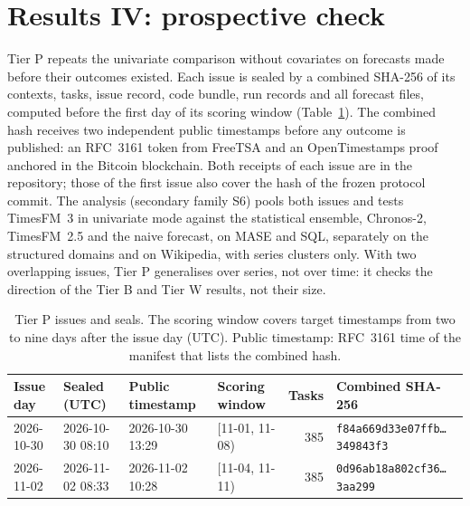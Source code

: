 \section{Results IV: prospective check}
\label{sec:prospective}

Tier P repeats the univariate comparison without covariates on forecasts made before their outcomes existed. Each issue is sealed by a
combined SHA-256 of its contexts, tasks, issue record, code bundle, run records and all forecast files, computed before the first
day of its scoring window (Table~\ref{tab:seals}). The combined hash receives two independent public timestamps before any outcome is
published: an RFC~3161 token from FreeTSA and an OpenTimestamps proof anchored in the Bitcoin blockchain. Both receipts of each issue are in the
repository; those of the first issue also cover the hash of the frozen protocol commit. The analysis (secondary family S6) pools both issues and tests TimesFM~3 in
univariate mode against the statistical ensemble, Chronos-2, TimesFM~2.5 and the naive forecast, on MASE and SQL, separately on the
structured domains and on Wikipedia, with series clusters only. With two overlapping issues, Tier P generalises over series, not
over time: it checks the direction of the Tier B and Tier W results, not their size.

\begin{table}[h]
\centering
\caption{Tier P issues and seals. The scoring window covers target timestamps from two to nine days after the issue day (UTC).
Public timestamp: RFC~3161 time of the manifest that lists the combined hash.}
\label{tab:seals}
\scriptsize
\begin{tabular}{llllrl}
\toprule
Issue day & Sealed (UTC) & Public timestamp & Scoring window & Tasks & Combined SHA-256 \\
\midrule
2026-10-30 & 2026-10-30 08:10 & 2026-10-30 13:29 & [11-01, 11-08) & 385 & \texttt{f84a669d33e07ffb\ldots 349843f3} \\
2026-11-02 & 2026-11-02 08:33 & 2026-11-02 10:28 & [11-04, 11-11) & 385 & \texttt{0d96ab18a802cf36\ldots 3aa299} \\
\bottomrule
\end{tabular}
\end{table}

